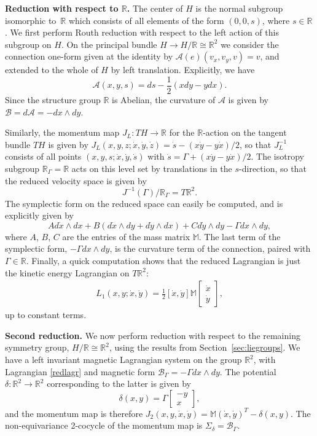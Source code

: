\documentclass[pdftex]{sigma}
\begin{document}
{\bf Reduction with respect to $\mathbb{R}$.}  The center of $H$ is the normal subgroup isomorphic to~$\mathbb{R}$ which consists of all elements of the form $(0, 0, s)$, where $s \in \mathbb{R}$.   We f\/irst perform Routh reduction with respect to the left action of this subgroup on $H$.   On the principal bundle $H \to H/\mathbb{R} \cong \mathbb{R}^2$ we consider the connection one-form given at the identity by $\mathcal{A}(e)(v_x, v_y, v) = v$, and extended to the whole of $H$ by left translation.  Explicitly, we have
\[
	\mathcal{A}(x, y, s)
	= ds - \frac{1}{2} (x dy - ydx).
\]
Since the structure group $\mathbb{R}$ is Abelian, the curvature of $\mathcal{A}$ is given by $\mathcal{B} = d \mathcal{A} = - dx \wedge dy$.

Similarly, the momentum map $J_L: TH \to \mathbb{R}$ for the $\mathbb{R}$-action on the tangent bundle $TH$  is given by $J_L(x, y, z; \dot{x}, \dot{y}, \dot{z}) = \dot{s} - (x \dot{y} - y \dot{x})/2$, so that $J_L^{-1}$ consists of all points $(x, y, s; \dot{x}, \dot{y}, \dot{s})$ with $\dot{s} = \Gamma + (x \dot{y} - y \dot{x})/2$.  The isotropy subgroup $\mathbb{R}_\Gamma = \mathbb{R}$ acts on this level set by translations in the $s$-direction, so that the reduced velocity space is given by
\[
	J^{-1}(\Gamma) / \mathbb{R}_\Gamma = T \mathbb{R}^2.
\]
The symplectic form on the reduced space can easily be computed, and is explicitly given by
\[
	 A d\dot{x} \wedge dx + B(d\dot{x} \wedge dy + d\dot{y} \wedge dx) + C d\dot{y} \wedge dy - \Gamma dx \wedge dy,
\]
where $A$, $B$, $C$ are the entries of the mass matrix $\mathbb{M}$.  The last term of the symplectic form, $-\Gamma dx \wedge dy$, is the curvature term of the connection, paired with $\Gamma \in \mathbb{R}$.  Finally, a quick computation shows that the reduced Lagrangian is just the kinetic energy Lagrangian on $T \mathbb{R}^2$:
\begin{gather} \label{redlagr}
	L_1(x, y; \dot{x}, \dot{y}) = \frac{1}{2} \left[\dot{x}, \dot{y} \right] \mathbb{M} \begin{bmatrix} \dot{x} \\ \dot{y} \end{bmatrix},
\end{gather}
up to constant terms.


{\bf Second reduction.}  We now perform reduction with respect to the remaining symmetry group, $H/\mathbb{R} \cong \mathbb{R}^2$, using the results from Section~\ref{sec:liegroups}.   We have a left invariant magnetic Lagrangian system on the group $\mathbb{R}^2$, with Lagrangian \eqref{redlagr} and magnetic form $\mathcal{B}_\Gamma = - \Gamma dx \wedge dy$.  The potential $\delta: \mathbb{R}^2 \to \mathbb{R}^2$ corresponding to the latter is given by
\[
	\delta(x, y) = \Gamma \begin{bmatrix}
			-y \\ x
		\end{bmatrix},
\]
and the momentum map is therefore $J_2 (x, y, \dot{x}, \dot{y}) = \mathbb{M}(\dot{x}, \dot{y})^T - \delta(x, y)$.  The non-equivariance 2-cocycle of the momentum map is $\Sigma_\delta = \mathcal{B}_\Gamma$.
\end{document}
